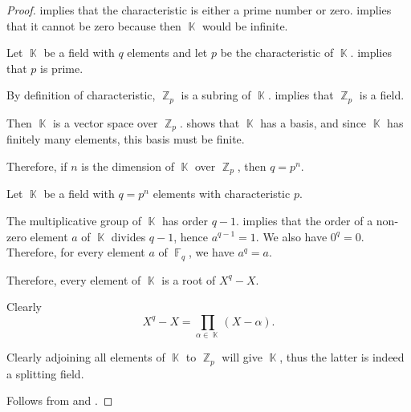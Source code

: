 \begin{proof}
    implies that the characteristic is either a prime number or zero.  implies that it cannot be zero because then \( \BbbK \) would be infinite.

   Let \( \BbbK \) be a field with \( q \) elements and let \( p \) be the characteristic of \( \BbbK \).  implies that \( p \) is prime.

  By definition of characteristic, \( \BbbZ_p \) is a subring of \( \BbbK \).  implies that \( \BbbZ_p \) is a field.

  Then \( \BbbK \) is a vector space over \( \BbbZ_p \).  shows that \( \BbbK \) has a basis, and since \( \BbbK \) has finitely many elements, this basis must be finite.

  Therefore, if \( n \) is the dimension of \( \BbbK \) over \( \BbbZ_p \), then \( q = p^n \).

   Let \( \BbbK \) be a field with \( q = p^n \) elements with characteristic \( p \).

  The multiplicative group of \( \BbbK \) has order \( q - 1 \).  implies that the order of a non-zero element \( a \) of \( \BbbK \) divides \( q - 1 \), hence \( a^{q - 1} = 1 \). We also have \( 0^q = 0 \). Therefore, for every element \( a \) of \( \BbbF_q \), we have \( a^q = a \).

  Therefore, every element of \( \BbbK \) is a root of \( X^q - X \).

   Clearly
  \begin{equation*}
    X^q - X = \prod_{\alpha \in \BbbK} (X - \alpha).
  \end{equation*}

  Clearly adjoining all elements of \( \BbbK \) to \( \BbbZ_p \) will give \( \BbbK \), thus the latter is indeed a splitting field.

   Follows from  and .
\end{proof}

